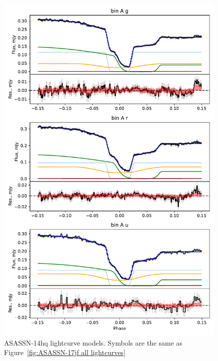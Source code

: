 \begin{figure}
    \centering
    \includegraphics[width=\textwidth]{figures/results/ASASSN-14hq/ASASSN-14hq_1.pdf}
    \caption{ASASSN-14hq lightcurve models. Symbols are the same as Figure~\ref{fig:ASASSN-17jf all lightcurves}}
    \label{fig:ASASSN-14hq all lightcurves}
\end{figure}
